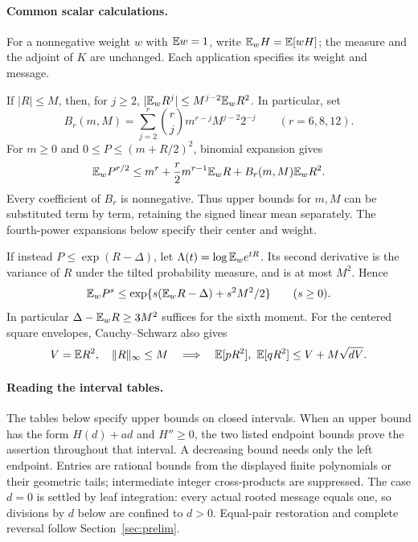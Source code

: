 \paragraph{Common scalar calculations.}
For a nonnegative weight $w$ with $\mathbb E w=1$, write
$\mathbb E_w H=\mathbb E[wH]$; the measure and the adjoint of $K$ are unchanged.
Each application specifies its weight and message.

If $|R|\le M$, then, for $j\ge2$,
$|\mathbb E_w R^j|\le M^{j-2}\mathbb E_wR^2$. In particular, set
\begin{equation}\label{eq:compact-binomial}
 B_r(m,M)=\sum_{j=2}^{r}\binom rj
                 m^{r-j}M^{j-2}2^{-j}\qquad(r=6,8,12).
\end{equation}
For $m\ge0$ and $0\le P\le(m+R/2)^2$, binomial expansion gives
\begin{equation}\label{eq:compact-power-bound}
 \mathbb E_w P^{r/2}\le m^r+\frac r2m^{r-1}\mathbb E_wR
                  +B_r(m,M)\mathbb E_wR^2 .
\end{equation}
Every coefficient of $B_r$ is nonnegative. Thus upper bounds for $m,M$
can be substituted term by term, retaining the signed linear mean separately.
The fourth-power expansions below specify their center and weight.

If instead $P\le\exp(R-\Delta)$, let
$\Lambda(t)=\log\mathbb E_w e^{tR}$. Its second derivative is the variance of
$R$ under the tilted probability measure, and is at most $M^2$. Hence
\begin{equation}\label{eq:compact-exponential}
 \mathbb E_w P^s\le
 \exp\{s(\mathbb E_wR-\Delta)+s^2M^2/2\}\qquad(s\ge0).
\end{equation}
In particular $\Delta-\mathbb E_wR\ge3M^2$ suffices for the sixth moment.
For the centered square envelopes, Cauchy--Schwarz also gives
\begin{equation}\label{eq:compact-weighted-variance}
 V=\mathbb E R^2,\quad \|R\|_\infty\le M
 \quad\Longrightarrow\quad
 \mathbb E[pR^2],\ \mathbb E[qR^2]\le V+M\sqrt{dV}.
\end{equation}

\paragraph{Reading the interval tables.}
The tables below specify upper bounds on closed intervals. When an upper
bound has the form $H(d)+ad$ and $H''\ge0$, the two listed endpoint bounds
prove the assertion throughout that interval. A decreasing bound needs only
the left endpoint. Entries are rational bounds from the displayed finite
polynomials or their geometric tails; intermediate integer cross-products
are suppressed.
The case $d=0$ is settled by leaf integration: every actual rooted message
equals one, so divisions by $d$ below are confined to $d>0$. Equal-pair
restoration and complete reversal follow Section~\ref{sec:prelim}.
